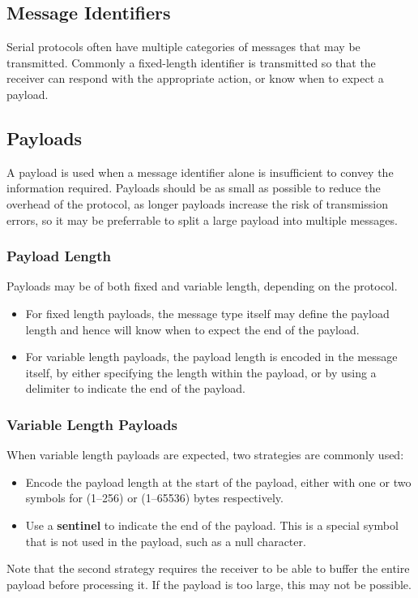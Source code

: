 \documentclass{report}
\begin{document}
\subsection{Message Identifiers}
Serial protocols often have multiple categories of messages that may be transmitted.
Commonly a fixed-length identifier is transmitted so that the receiver can
respond with the appropriate action, or know when to expect a payload.
\subsection{Payloads}
A payload is used when a message identifier alone is insufficient to convey the information required.
Payloads should be as small as possible to reduce the overhead of the protocol, as longer payloads
increase the risk of transmission errors, so it may be preferrable to split a large payload into multiple
messages.
\subsubsection{Payload Length}
Payloads may be of both fixed and variable length, depending on the protocol.
\begin{itemize}
    \item For fixed length payloads, the message type itself may define the payload length and hence will know when
    to expect the end of the payload.
    \item For variable length payloads, the payload length is encoded in the message itself, by either
    specifying the length within the payload, or by using a delimiter to indicate the end of the payload.
\end{itemize}
\subsubsection{Variable Length Payloads}
When variable length payloads are expected, two strategies are commonly used:
\begin{itemize}
    \item Encode the payload length at the start of the payload, either with one or two symbols for (1--256) or (1--65536) bytes respectively.
    \item Use a \textbf{sentinel} to indicate the end of the payload. This is a special symbol that is not used in the payload, such as a null character.
\end{itemize}
Note that the second strategy requires the receiver to be able to buffer the entire payload before processing it.
If the payload is too large, this may not be possible.
\end{document}
